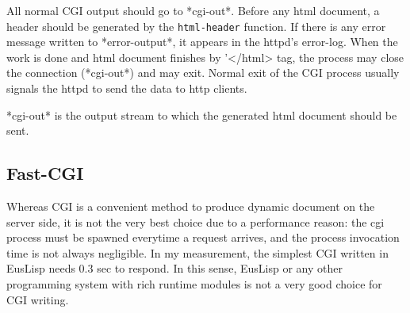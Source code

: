 All normal CGI output should go to *cgi-out*.
Before any html document, a header should be generated
by the {\tt html-header} function.
If there is any error message written to *error-output*,
it appears in the httpd's error-log.
When the work is done and html document finishes by '</html> tag,
the process may close the connection (*cgi-out*) and may exit.
Normal exit of the CGI process usually signals the httpd to
send the data to http clients.


{*cgi-out*} is the output stream to which the generated html document
should be sent.

\begin{refdesc}








\end{refdesc}

\subsection{Fast-CGI}

Whereas CGI is a convenient method to produce dynamic document on
the server side, it is not the very best choice due to a performance reason:
the cgi process must be spawned everytime a request arrives, and the
process invocation time is not always negligible.  In my measurement, 
the simplest CGI written in EusLisp needs 0.3 sec to respond.
In this sense, EusLisp or any other programming system with rich runtime
modules is not a very good choice for CGI writing.

